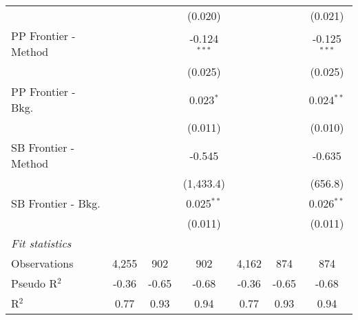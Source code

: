 \begin{tabular}{lcccccc}
                        &               &             & (0.020)        &               &         & (0.021)\\   
   PP Frontier - Method &               &             & -0.124$^{***}$ &               &         & -0.125$^{***}$\\   
                        &               &             & (0.025)        &               &         & (0.025)\\   
   PP Frontier - Bkg.   &               &             & 0.023$^{*}$    &               &         & 0.024$^{**}$\\   
                        &               &             & (0.011)        &               &         & (0.010)\\   
   SB Frontier - Method &               &             & -0.545         &               &         & -0.635\\   
                        &               &             & (1,433.4)      &               &         & (656.8)\\   
   SB Frontier - Bkg.   &               &             & 0.025$^{**}$   &               &         & 0.026$^{**}$\\   
                        &               &             & (0.011)        &               &         & (0.011)\\   
   \midrule
   \emph{Fit statistics}\\
   Observations         & 4,255         & 902         & 902            & 4,162         & 874     & 874\\  
   Pseudo R$^2$         & -0.36         & -0.65       & -0.68          & -0.36         & -0.65   & -0.68\\  
   R$^2$                & 0.77          & 0.93        & 0.94           & 0.77          & 0.93    & 0.94\\  
   

\end{tabular}
